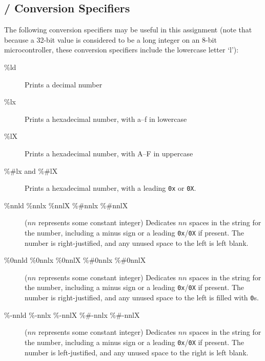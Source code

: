 \subsection{/ Conversion Specifiers} \label{subsec:conversionSpecifiers}

The following conversion specifiers may be useful in this assignment (note that because a 32-bit value is considered to be a long integer on an 8-bit microcontroller, these conversion specifiers include the lowercase letter `l'):
\begin{description}
    \item[\%ld] Prints a decimal number
    \item[\%lx] Prints a hexadecimal number, with a--f in lowercase
    \item[\%lX] Prints a hexadecimal number, with A--F in uppercase
    \item[\%\#lx and \%\#lX] Prints a hexadecimal number, with a leading \lstinline{0x} or \lstinline{0X}.
    \item[\%nnld \%nnlx \%nnlX \%\#nnlx \%\#nnlX] ($nn$ represents some constant integer) Dedicates $nn$ spaces in the string for the number, including a minus sign or a leading \lstinline{0x}/\lstinline{0X} if present.
    The number is right-justified, and any unused space to the left is left blank.
    \item[\%0nnld \%0nnlx \%0nnlX \%\#0nnlx \%\#0nnlX] ($nn$ represents some constant integer) Dedicates $nn$ spaces in the string for the number, including a minus sign or a leading \lstinline{0x}/\lstinline{0X} if present.
    The number is right-justified, and any unused space to the left is filled with \lstinline{0}s.
    \item[\%-nnld \%-nnlx \%-nnlX \%\#-nnlx \%\#-nnlX] ($nn$ represents some constant integer) Dedicates $nn$ spaces in the string for the number, including a minus sign or a leading \lstinline{0x}/\lstinline{0X} if present.
    The number is left-justified, and any unused space to the right is left blank.
\end{description}